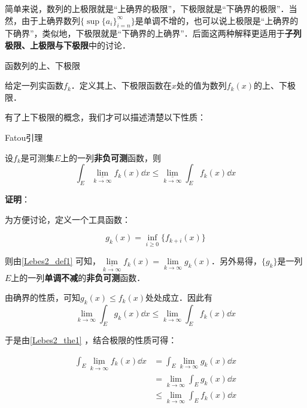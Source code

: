 简单来说，数列的上极限就是“上确界的极限”，下极限就是“下确界的极限”．当然，由于上确界数列$\{\sup \{a_i\}_{i=n}^\infty\}$是单调不增的，也可以说上极限是“上确界的下确界”，类似地，下极限就是“下确界的上确界”．后面这两种解释更适用于\textbf{子列极限、上极限与下极限}中的讨论．


\begin{definition}{函数列的上、下极限}\label{Lebes2_def1}

给定一列实函数$f_k$．定义其上、下极限函数在$x$处的值为数列$f_k(x)$的上、下极限．

\end{definition}

有了上下极限的概念，我们才可以描述清楚以下性质：

\begin{theorem}{Fatou引理}\label{Lebes2_the2}

设$f_k$是可测集$E$上的一列\textbf{非负可测}函数，则
\begin{equation}\label{Lebes2_eq1}
\int_E \underline{\lim}\limits_{k\to \infty} f_k(x) \dd x \leq \underline{\lim}\limits_{k\to \infty}\int_E f_k(x) \dd x
\end{equation}

\end{theorem}

\textbf{证明}：

为方便讨论，定义一个工具函数：

\begin{equation}
g_k(x) = \inf\limits_{i\geq 0}\{f_{k+i}(x)\}
\end{equation}

则由\autoref{Lebes2_def1} 可知，$\underline{\lim}\limits_{k\to\infty} f_k(x)=\lim\limits_{k\to\infty} g_k(x)$．另外易得，$\{g_k\}$是一列$E$上的一列\textbf{单调不减}的\textbf{非负可测}函数．

由确界的性质，可知$g_k(x)\leq f_k(x)$处处成立．因此有
\begin{equation}
\lim_{k\to\infty} \int_E g_k(x) \dd x \leq \lim_{k\to\infty} \int_E f_k(x) \dd x
\end{equation}

于是由\autoref{Lebes2_the1} ，结合极限的性质可得：

\begin{equation}
\begin{aligned}
\int_E \underline{\lim}\limits_{k\to\infty}f_k(x) \dd x &=
\int_E \lim_{k\to\infty} g_k(x) \dd x \\
&=\lim_{k\to\infty} \int_E g_k(x) \dd x\\
&\leq \lim_{k\to\infty} \int_E f_k(x) \dd x
\end{aligned}
\end{equation}


